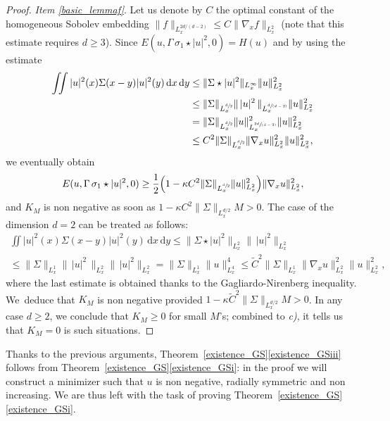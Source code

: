 \documentclass[10pt]{amsart}
\newcommand{\spfrac}[2]{\sfrac{#1}{(#2)}}
\let\tilde\oldtilde
\theoremstyle{definition}
\let\tilde\widetilde
\let\ds\displaystyle
\newcommand{\ud}{\, {\mathrm{d}}}
\begin{document}
\begin{proof}
\textit{Item \eqref{basic_lemmaf}}. Let us denote by $C$ the optimal constant of the homogeneous Sobolev embedding $\|f\|_{L_{x}^{2d/(d-2)}}\leq C\|\nabla_{x}f\|_{L_{x}^{2}}$ (note that this estimate requires $d\geq 3$). Since $E(u,\Gamma\,\sigma_{1}\star|u|^{2},0)=H(u)$ and by using the estimate\vspace*{-3pt}
\begin{align*}
\iint|u|^{2}(x)\Sigma(x-y)|u|^{2}(y)\ud x\ud y&\leq\|\Sigma\star|u|^{2}\|_{L_{x}^{\infty}}\|u\|_{L_{x}^{2}}^{2}\\
&\leq\|\Sigma\|_{L_{x}^{\sfrac{d}{2}}}\|\,|u|^{2}\,\|_{L_{x}^{\spfrac{d}{d-2}}}\|u\|_{L_{x}^{2}}^{2}\\
&=\|\Sigma\|_{L_{x}^{\sfrac{d}{2}}}\|u\|_{L_{x}^{\spfrac{2d}{d-2}}}^{2}\|u\|_{L_{x}^{2}}^{2}\\
&\leq C^{2}\|\Sigma\|_{L_{x}^{\sfrac{d}{2}}}\|\nabla_{x}u\|_{L_{x}^{2}}^{2}\|u\|_{L_{x}^{2}}^{2},
\end{align*}
we eventually obtain\vspace*{-3pt}
\[
E(u,\Gamma\,\sigma_{1}\star|u|^{2},0)\geq\frac{1}{2}\Bigl(1-\kappa C^{2}\|\Sigma\|_{L_{x}^{\sfrac{d}{2}}}\|u\|_{L_{x}^{2}}^{2}\Bigr)\|\nabla_{x}u\|_{L_{x}^{2}}^{2},
\]
and $K_{M}$ is non negative as soon as $1-\kappa C^{2}\|\Sigma\|_{L_{x}^{d/2}}M>0$. The case of the dimension $d=2$ can be treated as follows:\vspace*{-5pt}
\begin{multline*}
\ds\iint|u|^{2}(x)\Sigma(x-y)|u|^{2}(y)\ud x\ud y\leq\|\Sigma\star|u|^{2}\|_{L_{x}^{2}}\|\,|u|^{2}\|_{L_{x}^{2}}\\
\ds\leq\|\Sigma\|_{L_{x}^{1}}\|\,|u|^{2}\,\|_{L_{x}^{2}}\|\,|u|^{2}\|_{L_{x}^{2}}=\|\Sigma\|_{L_{x}^{1}}\|u\|_{L_{x}^{4}}^{4}\leq \widetilde{C}^{2}\|\Sigma\|_{L_{x}^{1}}\|\nabla_{x}u\|_{L_{x}^{2}}^{2}\|u\|_{L_{x}^{2}}^{2},
\end{multline*}
where the last estimate is obtained thanks to the Gagliardo-Nirenberg inequality.
We~deduce that $K_{M}$ is non negative provided $1-\kappa \tilde C^{2}\|\Sigma\|_{L_{x}^{d/2}}M>0$.
In any case $d\geq 2$, we conclude that $K_M\geq 0$ for small $M$'s; combined to \textit{c)}, it tells us that $K_M=0$ is such situations.
\end{proof}

Thanks to the previous arguments, Theorem~\ref{existence_GS}\eqref{existence_GSiii} follows from Theorem~\ref{existence_GS}\eqref{existence_GSi}: in the proof we will construct a minimizer such that $u$ is non negative, radially symmetric and non increasing. We are thus left with the task of proving Theorem~\ref{existence_GS}\eqref{existence_GSi}.
\end{document}
